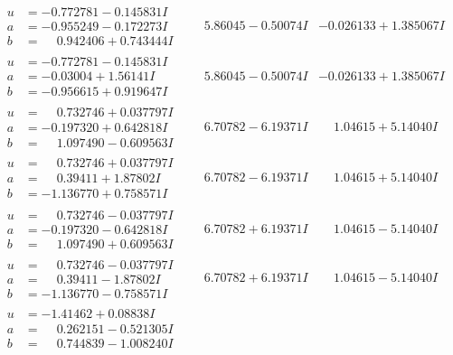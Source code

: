 \documentclass[1p]{elsarticle_modified}
\theoremstyle{definition}
\begin{document}
$$\begin{array}{c|c|c}
\begin{aligned}
u &= -0.772781 - 0.145831 I \\
a &= -0.955249 - 0.172273 I \\
b &= \phantom{-}0.942406 + 0.743444 I\end{aligned}
 & \phantom{-}5.86045 - 0.50074 I & -0.026133 + 1.385067 I \\ \hline\begin{aligned}
u &= -0.772781 - 0.145831 I \\
a &= -0.03004 + 1.56141 I \\
b &= -0.956615 + 0.919647 I\end{aligned}
 & \phantom{-}5.86045 - 0.50074 I & -0.026133 + 1.385067 I \\ \hline\begin{aligned}
u &= \phantom{-}0.732746 + 0.037797 I \\
a &= -0.197320 + 0.642818 I \\
b &= \phantom{-}1.097490 - 0.609563 I\end{aligned}
 & \phantom{-}6.70782 - 6.19371 I & \phantom{-}1.04615 + 5.14040 I \\ \hline\begin{aligned}
u &= \phantom{-}0.732746 + 0.037797 I \\
a &= \phantom{-}0.39411 + 1.87802 I \\
b &= -1.136770 + 0.758571 I\end{aligned}
 & \phantom{-}6.70782 - 6.19371 I & \phantom{-}1.04615 + 5.14040 I \\ \hline\begin{aligned}
u &= \phantom{-}0.732746 - 0.037797 I \\
a &= -0.197320 - 0.642818 I \\
b &= \phantom{-}1.097490 + 0.609563 I\end{aligned}
 & \phantom{-}6.70782 + 6.19371 I & \phantom{-}1.04615 - 5.14040 I \\ \hline\begin{aligned}
u &= \phantom{-}0.732746 - 0.037797 I \\
a &= \phantom{-}0.39411 - 1.87802 I \\
b &= -1.136770 - 0.758571 I\end{aligned}
 & \phantom{-}6.70782 + 6.19371 I & \phantom{-}1.04615 - 5.14040 I \\ \hline\begin{aligned}
u &= -1.41462 + 0.08838 I \\
a &= \phantom{-}0.262151 - 0.521305 I \\
b &= \phantom{-}0.744839 - 1.008240 I\end{aligned}

\end{array}$$
\end{document}
